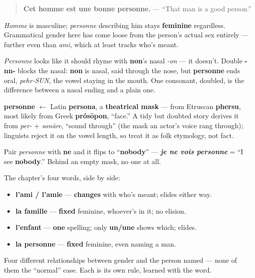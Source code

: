 \begin{quote}
\textbf{Cet homme est une bonne personne.} — \textquotedblleft{}That man is a good person.\textquotedblright{}
\end{quote}

\emph{Homme} is masculine; \emph{personne} describing him stays \textbf{feminine} regardless. Grammatical gender here has come loose from the person's actual sex entirely — further even than \emph{ami}, which at least tracks who's meant.

\begin{sounds}
\emph{Personne} looks like it should rhyme with \textbf{non}'s nasal \emph{-on} — it doesn't. Double \textbf{-nn-} blocks the nasal: \textbf{non} is nasal, said through the nose, but \textbf{personne} ends oral, \emph{pehr-SUN}, the vowel staying in the mouth. One consonant, doubled, is the difference between a nasal ending and a plain one.
\end{sounds}

\begin{cousinweb}
\textbf{personne} $\leftarrow$ Latin \textbf{persona}, a \textbf{theatrical mask} — from Etruscan \textbf{phersu}, most likely from Greek \textbf{prósōpon}, \textquotedblleft{}face.\textquotedblright{} A tidy but doubted story derives it from \emph{per-} + \emph{sonāre}, \textquotedblleft{}sound through\textquotedblright{} (the mask an actor's voice rang through); linguists reject it on the vowel length, so treat it as folk etymology, not fact.

Pair \emph{personne} with \textbf{ne} and it flips to \textquotedblleft{}\textbf{nobody}\textquotedblright{} — \emph{\textbf{je ne vois personne}} = \textquotedblleft{}I see \textbf{nobody}.\textquotedblright{} Behind an empty mask, no one at all.
\end{cousinweb}

\begin{grammarlens}[title={Grammar Lens: four people, four kinds of gender}]
The chapter's four words, side by side:

\begin{itemize}
\raggedright
  \item \textbf{l'ami / l'amie} — \textbf{changes} with who's meant; elides either way.
  \item \textbf{la famille} — \textbf{fixed} feminine, whoever's in it; no elision.
  \item \textbf{l'enfant} — \textbf{one} spelling; only \textbf{un/une} shows which; elides.
  \item \textbf{la personne} — \textbf{fixed} feminine, even naming a man.
\end{itemize}

Four different relationships between gender and the person named — none of them the \textquotedblleft{}normal\textquotedblright{} case. Each is its own rule, learned with the word.
\end{grammarlens}

